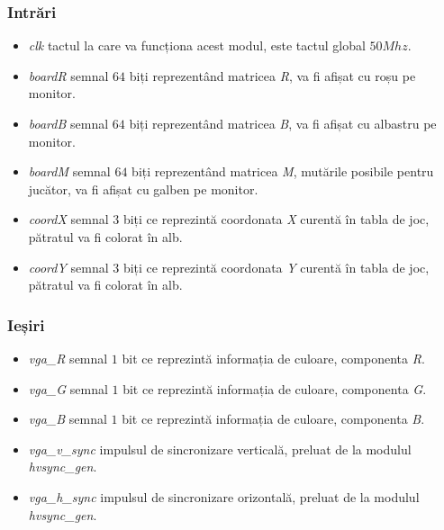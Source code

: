 \documentclass[12pt,twoside,a4paper,fleqn]{book}
\theoremstyle{definition}
\begin{document}
\subsubsection{Intrări}
\begin{itemize}
\item \emph{clk} tactul la care va funcționa acest modul, este tactul global $50Mhz$.
\item \emph{boardR} semnal $64$ biți reprezentând matricea \emph{R}, va fi afișat cu roșu pe monitor.
\item \emph{boardB} semnal $64$ biți reprezentând matricea \emph{B}, va fi afișat cu albastru pe monitor. 
\item \emph{boardM} semnal $64$ biți reprezentând matricea \emph{M}, mutările posibile pentru jucător, va fi afișat cu galben pe monitor.  
\item \emph{coordX} semnal $3$ biți ce reprezintă coordonata \emph{X} curentă în tabla de joc, pătratul va fi colorat în alb.
\item \emph{coordY} semnal $3$ biți ce reprezintă coordonata \emph{Y} curentă în tabla de joc, pătratul va fi colorat în alb. 
\end{itemize}

\subsubsection{Ieșiri}
\begin{itemize}
\item \emph{vga\_R} semnal $1$ bit ce reprezintă informația de culoare, componenta \emph{R}.
\item \emph{vga\_G} semnal $1$ bit ce reprezintă informația de culoare, componenta \emph{G}.
\item \emph{vga\_B} semnal $1$ bit ce reprezintă informația de culoare, componenta \emph{B}.
\item \emph{vga\_v\_sync} impulsul de sincronizare verticală, preluat de la modulul \emph{hvsync\_gen}.
\item \emph{vga\_h\_sync} impulsul de sincronizare orizontală, preluat de la modulul \emph{hvsync\_gen}.
\end{itemize}
\end{document}
